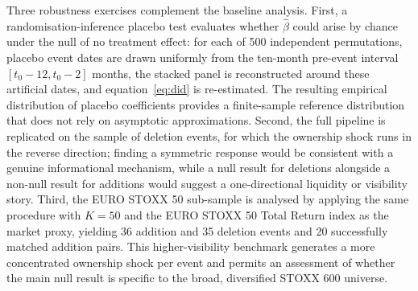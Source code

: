 \documentclass[12pt, a4paper]{article}
\begin{document}
Three robustness exercises complement the baseline analysis. First, a randomisation-inference placebo test evaluates whether $\hat{\beta}$ could arise by chance under the null of no treatment effect: for each of 500 independent permutations, placebo event dates are drawn uniformly from the ten-month pre-event interval $[t_0 - 12, t_0 - 2]$ months, the stacked panel is reconstructed around these artificial dates, and equation~\eqref{eq:did} is re-estimated. The resulting empirical distribution of placebo coefficients provides a finite-sample reference distribution that does not rely on asymptotic approximations. Second, the full pipeline is replicated on the sample of deletion events, for which the ownership shock runs in the reverse direction; finding a symmetric response would be consistent with a genuine informational mechanism, while a null result for deletions alongside a non-null result for additions would suggest a one-directional liquidity or visibility story. Third, the EURO STOXX 50 sub-sample is analysed by applying the same procedure with $K = 50$ and the EURO STOXX 50 Total Return index as the market proxy, yielding 36 addition and 35 deletion events and 20 successfully matched addition pairs. This higher-visibility benchmark generates a more concentrated ownership shock per event and permits an assessment of whether the main null result is specific to the broad, diversified STOXX 600 universe.\\



\end{document}
